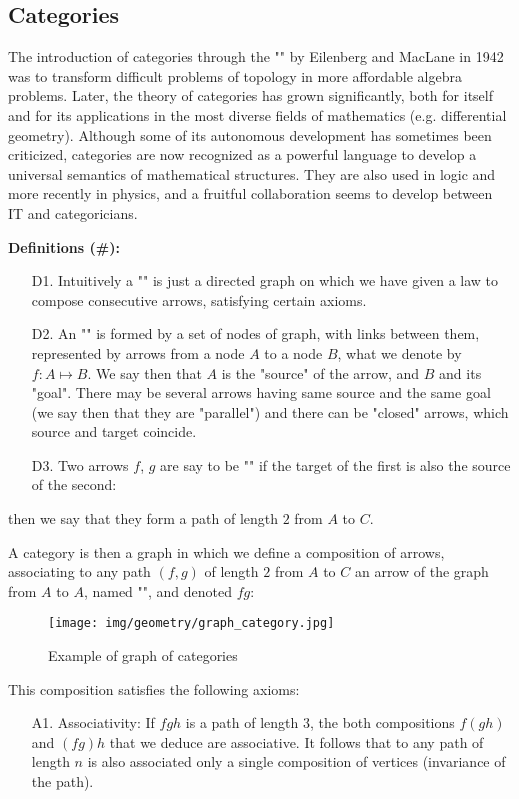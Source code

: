 {	\subsection{Categories}
	The introduction of categories through the "" by Eilenberg and MacLane in 1942 was to transform difficult problems of topology in more affordable algebra problems. Later, the theory of categories has grown significantly, both for itself and for its applications in the most diverse fields of mathematics (e.g. differential geometry). Although some of its autonomous development has sometimes been criticized, categories are now recognized as a powerful language to develop a universal semantics of mathematical structures. They are also used in logic and more recently in physics, and a fruitful collaboration seems to develop between IT and categoricians.
	
	\textbf{Definitions (\#\mydef):}
	\begin{enumerate}
		\item[D1.] Intuitively a "" is just a directed graph on which we have given a law to compose consecutive arrows, satisfying certain axioms.

		\item[D2.] An "" is formed by a set of nodes of graph, with links between them, represented by arrows from a node $A$ to a node $B$, what we denote by $f:A\mapsto B$. We say then that $A$ is the "source" of the arrow, and $B$ and its "goal". There may be several arrows having same source and the same goal (we say then that they are "parallel") and there can be "closed" arrows, which source and target coincide.

		\item[D3.] Two arrows $f$, $g$ are say to be "" if the target of the first is also the source of the second:
		
	\end{enumerate}
	then we say that they form a path of length $2$ from $A$ to $C$.

	A category is then a graph in which we define a composition of arrows, associating to any path $(f, g)$ of length $2$ from $A$ to $C$ an arrow of the graph from $A$ to $A$, named "", and denoted $fg$:
	\begin{figure}[H]
		\centering
		\texttt{[image: img/geometry/graph\_category.jpg]}
		\caption{Example of graph of categories}
	\end{figure}
	This composition satisfies the following axioms:
	\begin{enumerate}
		\item[A1.] Associativity: If $fgh$ is a path of length $3$, the both compositions $f(gh)$ and $(fg)h$ that we deduce are associative. It follows that to any path of length $n$ is also associated only a single composition of vertices (invariance of the path).


\end{enumerate}}
